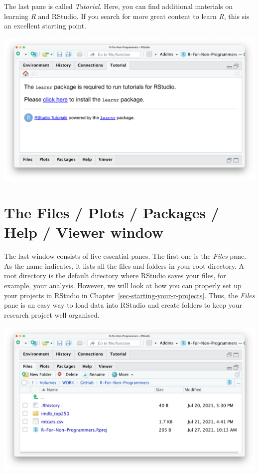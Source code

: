 \documentclass[
  letterpaper,
  DIV=11,
  numbers=noendperiod]{scrreprt}
\begin{document}
The last pane is called \emph{Tutorial}. Here, you can find additional
materials on learning \emph{R} and RStudio. If you search for more great
content to learn \emph{R}, this sis an excellent starting point.

\includegraphics{images/chapter_04_img/04_environment_history_etc/04_rstudio_tutorial.png}

\section{The Files / Plots / Packages / Help / Viewer
window}\label{sec-the-files-plots-packages-help-viewer-window}

The last window consists of five essential panes. The first one is the
\emph{Files} pane. As the name indicates, it lists all the files and
folders in your root directory. A root directory is the default
directory where RStudio saves your files, for example, your analysis.
However, we will look at how you can properly set up your projects in
RStudio in Chapter~\ref{sec-starting-your-r-projects}. Thus, the
\emph{Files} pane is an easy way to load data into RStudio and create
folders to keep your research project well organised.

\includegraphics{images/chapter_04_img/05_files_plots_etc/01_rstudio_files.png}
\end{document}
